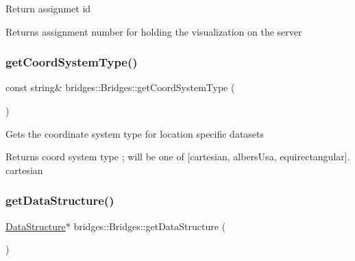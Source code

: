 Return assignmet id

\begin{DoxyReturn}{Returns}
assignment number for holding the visualization on the server 
\end{DoxyReturn}
\mbox{\label{classbridges_1_1_bridges_aac3cdb607177ff537f5160c3790d814a}} 
\subsubsection{\texorpdfstring{get\+Coord\+System\+Type()}{getCoordSystemType()}}
{\footnotesize\ttfamily const string\& bridges\+::\+Bridges\+::get\+Coord\+System\+Type (\begin{DoxyParamCaption}{ }\end{DoxyParamCaption})\hspace{0.3cm}{\ttfamily [inline]}}

Gets the coordinate system type for location specific datasets

\begin{DoxyReturn}{Returns}
coord system type ; will be one of \mbox{[}\textquotesingle{}cartesian\textquotesingle{}, \textquotesingle{}albers\+Usa\textquotesingle{}, \textquotesingle{}equirectangular\textquotesingle{}\mbox{]}. \textquotesingle{}cartesian\textquotesingle{} 
\end{DoxyReturn}
\mbox{\label{classbridges_1_1_bridges_a5ddfb17c2fb2d3ca89e7564677251dea}} 
\subsubsection{\texorpdfstring{get\+Data\+Structure()}{getDataStructure()}}
{\footnotesize\ttfamily \hyperlink{classbridges_1_1datastructure_1_1_data_structure}{Data\+Structure}$\ast$ bridges\+::\+Bridges\+::get\+Data\+Structure (\begin{DoxyParamCaption}{ }\end{DoxyParamCaption})\hspace{0.3cm}{\ttfamily [inline]}}

